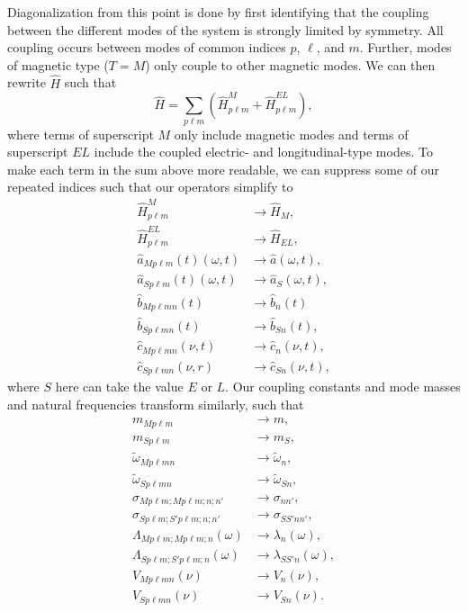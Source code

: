 \documentclass{article}
\begin{document}
Diagonalization from this point is done by first identifying that the coupling between the different modes of the system is strongly limited by symmetry. All coupling occurs between modes of common indices $p$, $\ell$, and $m$. Further, modes of magnetic type ($T = M$) only couple to other magnetic modes. We can then rewrite $\hat{H}$ such that
\begin{equation}
\hat{H} = \sum_{p\ell m}\left(\hat{H}_{p\ell m}^M + \hat{H}_{p\ell m}^{EL}\right),
\end{equation}
where terms of superscript $M$ only include magnetic modes and terms of superscript $EL$ include the coupled electric- and longitudinal-type modes. To make each term in the sum above more readable, we can suppress some of our repeated indices such that our operators simplify to
\begin{equation}
\begin{split}
\hat{H}_{p\ell m}^M&\to\hat{H}_M,\\
\hat{H}_{p\ell m}^{EL}&\to\hat{H}_{EL},\\
\hat{a}_{Mp\ell m}(t)(\omega,t)&\to\hat{a}(\omega,t),\\
\hat{a}_{Sp\ell m}(t)(\omega,t)&\to\hat{a}_{S}(\omega,t),\\
\hat{b}_{Mp\ell mn}(t)&\to\hat{b}_n(t)\\
\hat{b}_{Sp\ell mn}(t)&\to\hat{b}_{Sn}(t),\\
\hat{c}_{Mp\ell mn}(\nu,t)&\to\hat{c}_n(\nu,t),\\
\hat{c}_{Sp\ell mn}(\nu,r)&\to\hat{c}_{Sn}(\nu,t),
\end{split}
\end{equation}
where $S$ here can take the value $E$ or $L$. Our coupling constants and mode masses and natural frequencies transform similarly, such that
\begin{equation}
\begin{split}
m_{Mp\ell m}&\to m,\\
m_{Sp\ell m}&\to m_S,\\
\tilde{\omega}_{Mp\ell mn}&\to\tilde{\omega}_n,\\
\tilde{\omega}_{Sp\ell mn}&\to\tilde{\omega}_{Sn},\\
\sigma_{Mp\ell m;Mp\ell m;n;n'}&\to \sigma_{nn'},\\
\sigma_{Sp\ell m;S'p\ell m;n;n'}&\to\sigma_{SS'nn'},\\
\Lambda_{Mp\ell m;Mp\ell m;n}(\omega)&\to\lambda_n(\omega),\\
\Lambda_{Sp\ell m;S'p\ell m;n}(\omega)&\to \lambda_{SS'n}(\omega),\\
 V_{Mp\ell mn}(\nu)&\to V_n(\nu),\\
 V_{Sp\ell mn}(\nu)&\to V_{Sn}(\nu).
\end{split}
\end{equation}
\end{document}

